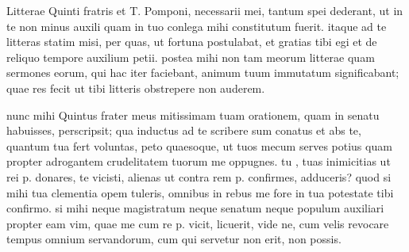


 Litterae Quinti fratris et T. Pomponi, necessarii mei, tantum spei dederant, ut in te non minus auxili quam in tuo conlega mihi constitutum fuerit. itaque ad te litteras statim misi, per quas, ut fortuna postulabat, et gratias tibi egi et de reliquo tempore auxilium petii. postea mihi non tam meorum litterae quam sermones eorum, qui hac iter faciebant, animum tuum immutatum significabant; quae res fecit ut tibi litteris obstrepere non auderem.

 nunc mihi Quintus frater meus mitissimam tuam orationem, quam in senatu habuisses, perscripsit; qua inductus ad te scribere sum conatus et abs te, quantum tua fert voluntas, peto quaesoque, ut tuos mecum serves potius quam propter adrogantem crudelitatem tuorum me oppugnes. tu , tuas inimicitias ut rei p. donares, te vicisti, alienas ut contra rem p. confirmes, adduceris? quod si mihi tua clementia opem tuleris, omnibus in rebus me fore in tua potestate tibi confirmo. si mihi neque magistratum neque senatum neque populum auxiliari propter eam vim, quae me cum re p. vicit, licuerit, vide ne, cum velis revocare tempus omnium servandorum, cum qui servetur non erit, non possis.
